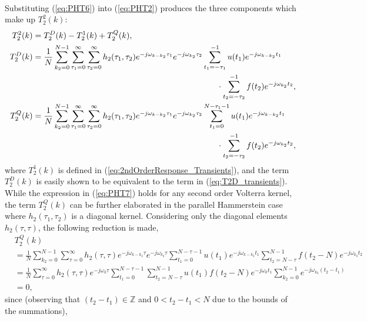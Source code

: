 \begin{subappendices}
\begin{align}
\end{align}
Substituting (\ref{eq:PHT6}) into (\ref{eq:PHT2}) produces the three components which make up $T_2^2(k)$:
\begin{equation}
\begin{aligned}
T_2^2(k) &= T_2^D(k) - T_2^1(k) + T_2^Q(k), \\
T_2^D(k) &= \frac{1}{N} \sum\limits_{k_2=0}^{N-1} \sum\limits_{\tau_{1}=0}^{\infty} \sum\limits_{\tau_{2}=0}^{\infty} h_{2}(\tau_{1},\tau_{2})  e^{-j \omega_{k-k_2} \tau_{1}} e^{-j \omega_{k_2} \tau_{2}}  \sum\limits_{t_1=-\tau_{1}}^{-1} u(t_1) e^{-j \omega_{k-k_2} t_1}  \\ & \hspace{0.65\textwidth}  \cdot \sum\limits_{t_2=-\tau_{2}}^{-1} f(t_2) e^{-j \omega_{k_2} t_2}, \\
T_2^Q(k) &= \frac{1}{N} \sum\limits_{k_2=0}^{N-1} \sum\limits_{\tau_{1}=0}^{\infty} \sum\limits_{\tau_{2}=0}^{\infty} h_{2}(\tau_{1},\tau_{2})  e^{-j \omega_{k-k_2} \tau_{1}} e^{-j \omega_{k_2} \tau_{2}}  \sum\limits_{t_1=0}^{N-\tau_1-1} u(t_1) e^{-j \omega_{k-k_2} t_1}  \\ & \hspace{0.65\textwidth}  \cdot \sum\limits_{t_2=-\tau_{2}}^{-1} f(t_2) e^{-j \omega_{k_2} t_2}, 
\end{aligned} 
\label{eq:PHT7}
\end{equation}
where $T_2^1(k)$ is defined in (\ref{eq:2ndOrderResponse_Transients}), and the term $T_2^D(k)$ is easily shown to be equivalent to the term in (\ref{eq:T2D_transients}). While the expression in (\ref{eq:PHT7}) holds for any second order Volterra kernel, the term $T_2^Q(k)$ can be further elaborated in the parallel Hammerstein case where $h_2(\tau_1,\tau_2)$ is a diagonal kernel. Considering only the diagonal elements $h_2(\tau,\tau)$, the following reduction is made,
\begin{equation}
\begin{aligned}
&T_2^Q(k) \\
&= \frac{1}{N} \sum\limits_{k_2=0}^{N-1} \sum\limits_{\tau=0}^{\infty} h_{2}(\tau,\tau)  e^{-j \omega_{k-k_2} \tau} e^{-j \omega_{k_2} \tau} \sum\limits_{t_1= 0}^{N-\tau-1} u(t_1) e^{-j \omega_{k-k_2} t_1} \sum\limits_{t_2= N-\tau}^{N-1} f(t_2-N) e^{-j \omega_{k_2} t_2} \\
&= \frac{1}{N} \sum\limits_{\tau=0}^{\infty} h_{2}(\tau,\tau)  e^{-j \omega_{k} \tau} \sum\limits_{t_1= 0}^{N-\tau-1} \sum\limits_{t_2= N-\tau}^{N-1} u(t_1) f(t_2-N) e^{-j \omega_{k} t_1}  \sum\limits_{k_{2}=0}^{N-1} e^{-j \omega_{k_2}(t_2 - t_1)} \\
&= 0,
\end{aligned}
\label{eq:PHT8}
\end{equation}
since (observing that $(t_2 - t_1) \in \mathbb{Z}$ and $0 < t_2 - t_1 < N$ due to the bounds of the summations),


\end{subappendices}
